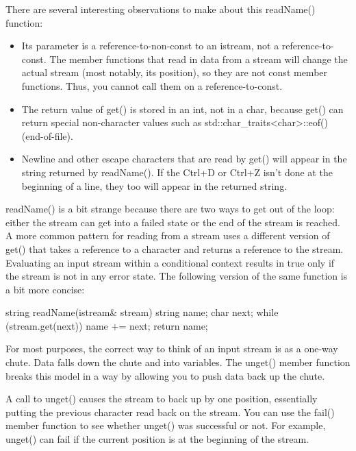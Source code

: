 There are several interesting observations to make about this readName() function:

\begin{itemize}
\item
Its parameter is a reference-to-non-const to an istream, not a reference-to-const. The member functions that read in data from a stream will change the actual stream (most notably, its position), so they are not const member functions. Thus, you cannot call them on a reference-to-const.

\item
The return value of get() is stored in an int, not in a char, because get() can return special non-character values such as std::char\_traits<char>::eof() (end-of-file).

\item
Newline and other escape characters that are read by get() will appear in the string returned by readName(). If the Ctrl+D or Ctrl+Z isn’t done at the beginning of a line, they too will appear in the returned string.
\end{itemize}

readName() is a bit strange because there are two ways to get out of the loop: either the stream can get into a failed state or the end of the stream is reached. A more common pattern for reading from a stream uses a different version of get() that takes a reference to a character and returns a reference to the stream. Evaluating an input stream within a conditional context results in true only if the stream is not in any error state. The following version of the same function is a bit more concise:

\begin{cpp}
string readName(istream& stream)
{
    string name;
    char next;
    while (stream.get(next)) {
        name += next;
    }
    return name;
}
\end{cpp}


For most purposes, the correct way to think of an input stream is as a one-way chute. Data falls down the chute and into variables. The unget() member function breaks this model in a way by allowing you to push data back up the chute.

A call to unget() causes the stream to back up by one position, essentially putting the previous character read back on the stream. You can use the fail() member function to see whether unget() was successful or not. For example, unget() can fail if the current position is at the beginning of the stream.

